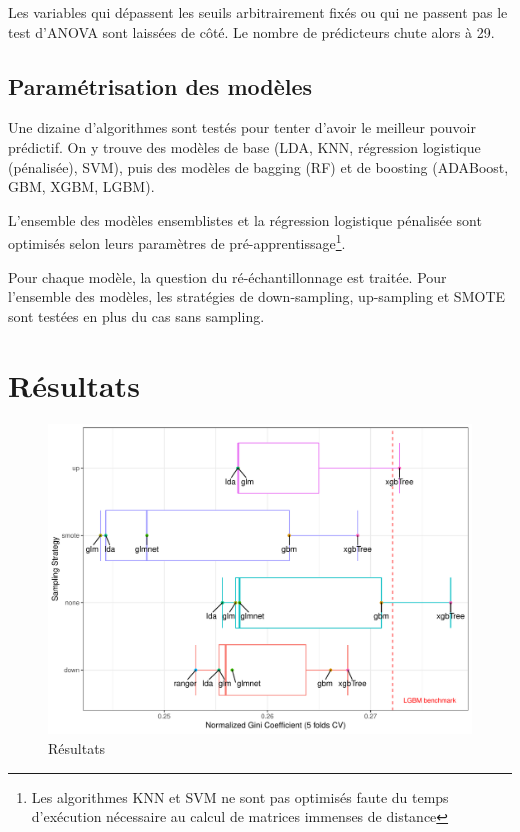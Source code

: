 \documentclass[french]{article}
\begin{document}
\begin{multicols}{2}
Les variables qui dépassent les seuils arbitrairement fixés ou qui ne passent pas le test d'ANOVA sont laissées de côté. Le nombre de prédicteurs chute alors à 29.

\subsection{Paramétrisation des modèles}

Une dizaine d'algorithmes sont testés pour tenter d'avoir le meilleur pouvoir prédictif. On y trouve des modèles de base (LDA, KNN, régression logistique (pénalisée), SVM), puis des modèles de bagging (RF) et de boosting (ADABoost, GBM, XGBM, LGBM).

L'ensemble des modèles ensemblistes et la régression logistique pénalisée sont optimisés selon leurs paramètres de pré-apprentissage\footnote{Les algorithmes KNN et SVM ne sont pas optimisés faute du temps d'exécution nécessaire au calcul de matrices immenses de distance}.

Pour chaque modèle, la question du ré-échantillonnage est traitée. Pour l'ensemble des modèles, les stratégies de down-sampling, up-sampling et SMOTE sont testées en plus du cas sans sampling.

\section{Résultats}

\begin{figure}[H] \centering
  \includegraphics[width = \columnwidth]{img/results}
  \caption{Résultats}
\end{figure}

\nocite{*}



\end{multicols}
\end{document}
